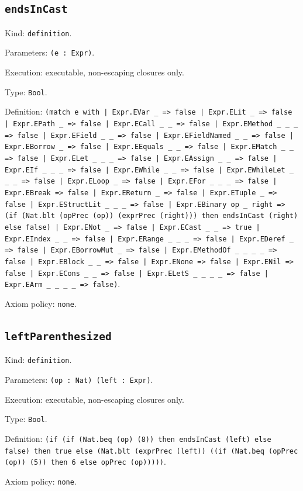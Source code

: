 \documentclass[11pt]{article}
\begin{document}
\subsection*{\texttt{endsInCast}}
\noindent Kind: \texttt{definition}.\par
\noindent Parameters: \texttt{(e : Expr)}.\par
\noindent Execution: executable, non-escaping closures only.\par
\noindent Type: \texttt{Bool}.\par
\noindent Definition: \texttt{(match e with | Expr.EVar \_ => false | Expr.ELit \_ => false | Expr.EPath \_ => false | Expr.ECall \_ \_ => false | Expr.EMethod \_ \_ \_ => false | Expr.EField \_ \_ => false | Expr.EFieldNamed \_ \_ => false | Expr.EBorrow \_ => false | Expr.EEquals \_ \_ => false | Expr.EMatch \_ \_ => false | Expr.ELet \_ \_ \_ => false | Expr.EAssign \_ \_ => false | Expr.EIf \_ \_ \_ => false | Expr.EWhile \_ \_ => false | Expr.EWhileLet \_ \_ \_ => false | Expr.ELoop \_ => false | Expr.EFor \_ \_ \_ => false | Expr.EBreak => false | Expr.EReturn \_ => false | Expr.ETuple \_ => false | Expr.EStructLit \_ \_ \_ => false | Expr.EBinary op \_ right => (if (Nat.blt (opPrec (op)) (exprPrec (right))) then endsInCast (right) else false) | Expr.ENot \_ => false | Expr.ECast \_ \_ => true | Expr.EIndex \_ \_ => false | Expr.ERange \_ \_ \_ => false | Expr.EDeref \_ => false | Expr.EBorrowMut \_ => false | Expr.EMethodOf \_ \_ \_ \_ => false | Expr.EBlock \_ \_ => false | Expr.ENone => false | Expr.ENil => false | Expr.ECons \_ \_ => false | Expr.ELetS \_ \_ \_ \_ => false | Expr.EArm \_ \_ \_ \_ => false)}.\par
\noindent Axiom policy: \texttt{none}.\par
\subsection*{\texttt{leftParenthesized}}
\noindent Kind: \texttt{definition}.\par
\noindent Parameters: \texttt{(op : Nat) (left : Expr)}.\par
\noindent Execution: executable, non-escaping closures only.\par
\noindent Type: \texttt{Bool}.\par
\noindent Definition: \texttt{(if (if (Nat.beq (op) (8)) then endsInCast (left) else false) then true else (Nat.blt (exprPrec (left)) ((if (Nat.beq (opPrec (op)) (5)) then 6 else opPrec (op)))))}.\par
\noindent Axiom policy: \texttt{none}.\par
\end{document}
